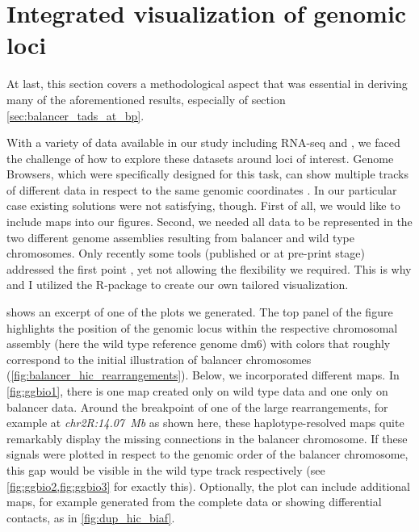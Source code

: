\section{Integrated visualization of genomic loci}
\label{sec:balancer_visualization}

At last, this section covers a methodological aspect that was essential in
deriving many of the aforementioned results, especially of section
\cref{sec:balancer_tads_at_bp}.

With a variety of data available in our study including RNA-seq and \hic, we
faced the challenge of how to explore these datasets around loci of interest.
Genome Browsers, which were specifically designed for this task, can show
multiple tracks of different data in respect to the same genomic coordinates
\citep{Freese2016,Thorvaldsdottir2013,Gramates2017}. In our particular case
existing solutions were not satisfying, though. First of all, we would like to
include \hic maps into our figures. Second, we needed all data to be
represented in the two different genome assemblies resulting from balancer and
wild type chromosomes. Only recently some tools (published or at pre-print
stage) addressed the first point \citep{Ramirez2018,Kerpedjiev2017}, yet not
allowing the flexibility we required. This is why \alek and I utilized the
R-package \ggbio to create our own tailored
visualization.


 shows an excerpt of one of the plots we generated. The top
panel of the figure highlights  the position of the genomic locus
within the respective chromosomal assembly (here the wild type reference genome
\acs{dm6}) with colors that roughly correspond to the initial illustration of
balancer chromosomes (\cref{fig:balancer_hic_rearrangements}). Below, we
incorporated different \hic maps. In \cref{fig:ggbio1}, there is one \hic
map created only on  wild type data and one only on 
balancer \hic data. Around the breakpoint of one of the large rearrangements,
for example at \textit{chr2R:14.07~Mb} as shown here, these haplotype-resolved
\hic maps quite remarkably display the missing connections in the balancer
chromosome. If these signals were plotted in respect to the genomic order of
the balancer chromosome, this gap would be visible in the wild type track
respectively (see \cref{fig:ggbio2,fig:ggbio3} for exactly this).
Optionally, the plot can include additional \hic maps, for
example generated from the complete data or showing differential contacts,
as in \cref{fig:dup_hic_biaf}.


